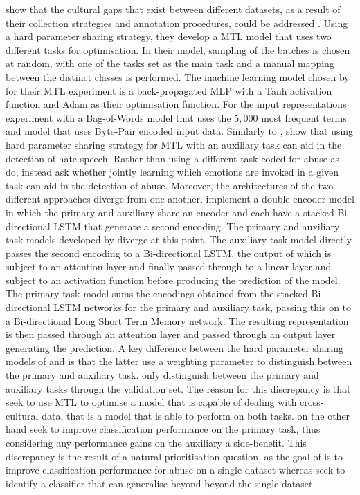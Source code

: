 \citet{Waseem:2018} show that the cultural gaps that exist between different datasets, as a result of their collection strategies and annotation procedures, could be addressed .
Using a hard parameter sharing strategy, they develop a MTL model that uses two different tasks for optimisation.
In their model, sampling of the batches is chosen at random, with one of the tasks set as the main task and a manual mapping between the distinct classes is performed.
The machine learning model chosen by \citet{Waseem:2018} for their MTL experiment is a back-propagated MLP with a Tanh activation function and Adam as their optimisation function.
For the input representations \citet{Waseem:2018} experiment with a Bag-of-Words model that uses the $5,000$ most frequent terms and model that uses Byte-Pair encoded input data.
Similarly to \citet{Waseem:2018}, \citet{Rajamanickam:2020} show that using hard parameter sharing strategy for MTL with an auxiliary task can aid in the detection of hate speech.
Rather than using a different task coded for abuse as \citet{Waseem:2018} do, \citet{Rajamanickam:2020} instead ask whether jointly learning which emotions are invoked in a given task can aid in the detection of abuse.
Moreover, the architectures of the two different approaches diverge from one another.
\citet{Rajamanickam:2020} implement a double encoder model in which the primary and auxiliary share an encoder and each have a stacked Bi-directional LSTM that generate a second encoding.
The primary and auxiliary task models developed by \citet{Rajamanickam:2020} diverge at this point. 
The auxiliary task model directly passes the second encoding to a Bi-directional LSTM, the output of which is subject to an attention layer and finally passed through to a linear layer and subject to an activation function before producing the prediction of the model.
The primary task model sums the encodings obtained from the stacked Bi-directional LSTM networks for the primary and auxiliary task, passing this on to a Bi-directional Long Short Term Memory network.
The resulting representation is then passed through an attention layer and passed through an output layer generating the prediction.
A key difference between the hard parameter sharing models of \citet{Waseem:2018} and \citet{Rajamanickam:2020} is that the latter use a weighting parameter to distinguish between the primary and auxiliary task.
\citet{Waseem:2018} only distinguish between the primary and auxiliary tasks through the validation set.
The reason for this discrepancy is that \citet{Waseem:2018} seek to use MTL to optimise a model that is capable of dealing with cross-cultural data, that is a model that is able to perform on both tasks.
\citet{Rajamanickam:2020} on the other hand seek to improve classification performance on the primary task, thus considering any performance gains on the auxiliary a side-benefit.
This discrepancy is the result of a natural prioritisation question, as the goal of \citet{Rajamanickam:2020} is to improve classification performance for abuse on a single dataset whereas \citet{Waseem:2018} seek to identify a classifier that can generalise beyond beyond the single dataset.

